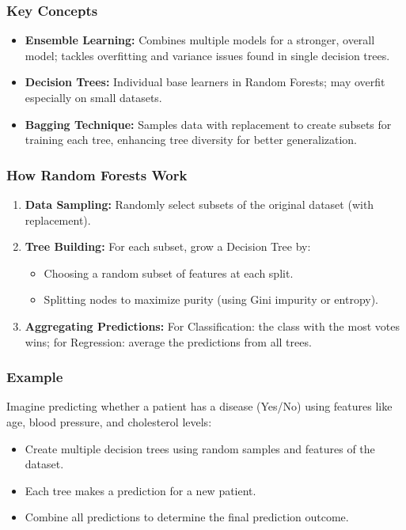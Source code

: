 \documentclass[aspectratio=169]{beamer}
\begin{document}
\begin{frame}[fragile]
    \frametitle{Key Concepts}
    \begin{itemize}
        \item \textbf{Ensemble Learning:} 
        Combines multiple models for a stronger, overall model; tackles overfitting and variance issues found in single decision trees.
        
        \item \textbf{Decision Trees:} 
        Individual base learners in Random Forests; may overfit especially on small datasets.
        
        \item \textbf{Bagging Technique:} 
        Samples data with replacement to create subsets for training each tree, enhancing tree diversity for better generalization.
    \end{itemize}
\end{frame}

\begin{frame}[fragile]
    \frametitle{How Random Forests Work}
    \begin{enumerate}
        \item \textbf{Data Sampling:} 
        Randomly select subsets of the original dataset (with replacement).
        
        \item \textbf{Tree Building:} 
        For each subset, grow a Decision Tree by:
        \begin{itemize}
            \item Choosing a random subset of features at each split.
            \item Splitting nodes to maximize purity (using Gini impurity or entropy).
        \end{itemize}
        
        \item \textbf{Aggregating Predictions:} 
        For Classification: the class with the most votes wins; for Regression: average the predictions from all trees.
    \end{enumerate}
\end{frame}

\begin{frame}[fragile]
    \frametitle{Example}
    Imagine predicting whether a patient has a disease (Yes/No) using features like age, blood pressure, and cholesterol levels:
    \begin{itemize}
        \item Create multiple decision trees using random samples and features of the dataset.
        \item Each tree makes a prediction for a new patient.
        \item Combine all predictions to determine the final prediction outcome.
    \end{itemize}
\end{frame}
\end{document}
